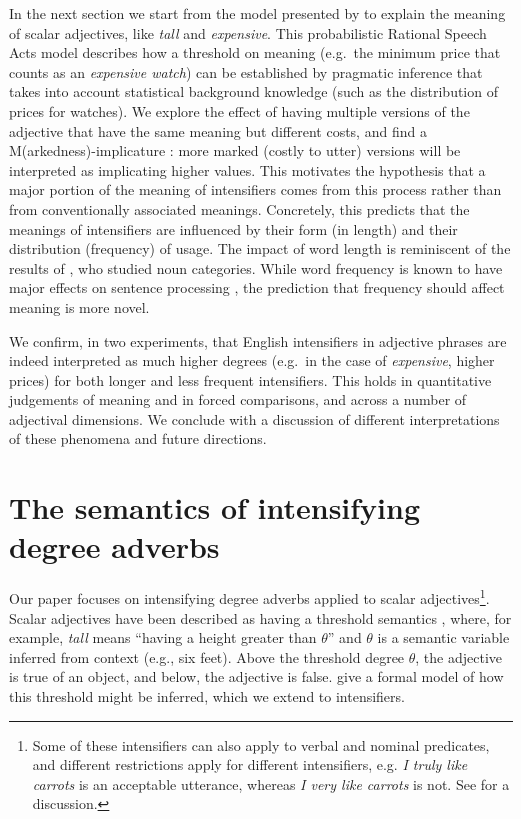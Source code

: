 \documentclass[10pt,letterpaper]{article}
\newcommand{\w}[1]{\emph{#1}}
\newcommand{\todo}[1]{{\color{red}#1}}
\begin{document}
In the next section we start from the model presented by  to explain the meaning of scalar adjectives, like \emph{tall} and \emph{expensive}. This probabilistic Rational Speech Acts \cite{frank,goodman} model describes how a threshold on meaning (e.g.~the minimum price that counts as an \emph{expensive watch}) can be established by pragmatic inference that takes into account statistical background knowledge (such as the distribution of prices for watches). We explore the effect of having multiple versions of the adjective that have the same meaning but different costs, and find a M(arkedness)-implicature \cite{levinson}: more marked (costly to utter) versions will be interpreted as implicating higher values.
This motivates the hypothesis that a major portion of the meaning of intensifiers comes from this process rather than from conventionally associated meanings. Concretely, this predicts that the meanings of intensifiers are influenced by their form (in length) and their distribution (frequency) of usage. The impact of word length is reminiscent of the results of , who studied noun categories. While word frequency is known to have major effects on sentence processing \todo{\cite[e.g.]{levy}}, the prediction that frequency should affect meaning is more novel.

We confirm, in two experiments, that English intensifiers in adjective phrases are indeed interpreted as much higher degrees (e.g.~in the case of \w{expensive}, higher prices) for both longer and less frequent intensifiers. This holds in quantitative judgements of meaning and in forced comparisons, and across a number of adjectival dimensions. We conclude with a discussion of different interpretations of these phenomena and future directions.

\section{The semantics of intensifying degree adverbs}

Our paper focuses on intensifying degree adverbs applied to scalar adjectives\footnote{Some of these intensifiers can also apply to verbal and nominal predicates, and different restrictions apply for different intensifiers, e.g. \w{I truly like carrots} is an acceptable utterance, whereas \w{I very like carrots} is not. See  for a discussion.}. Scalar adjectives have been described as having a threshold semantics \cite{kennedy}, where, for example, \w{tall} means ``having a height greater than $\theta$'' and $\theta$ is a semantic variable inferred from context (e.g., six feet). Above the threshold degree $\theta$, the adjective is true of an object, and below, the adjective is false.
 give a formal model of how this threshold might be inferred, which we extend to intensifiers.
\end{document}
